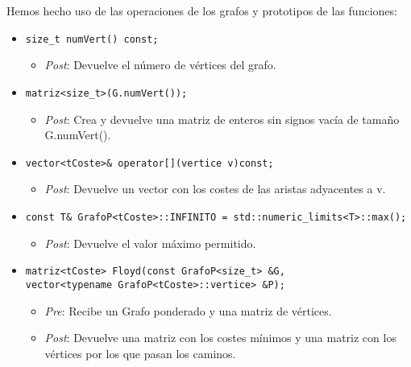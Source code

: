 Hemos hecho uso de las operaciones de los grafos y prototipos de las funciones:
\begin{itemize}
  \item \verb |size_t numVert() const;|
  \begin{itemize}
    \item \textit{Post}: Devuelve el número de vértices del grafo.
  \end{itemize}
  \item \verb |matriz<size_t>(G.numVert());|
  \begin{itemize}
    \item \textit{Post}: Crea y devuelve una matriz de enteros sin signos vacía de tamaño G.numVert().
  \end{itemize}
  \item \verb |vector<tCoste>& operator[](vertice v)const;|
  \begin{itemize}
    \item \textit{Post}: Devuelve un vector con los costes de las aristas adyacentes a v.
  \end{itemize}
  \item \verb |const T& GrafoP<tCoste>::INFINITO = std::numeric_limits<T>::max();|
  \begin{itemize}
    \item \textit{Post}: Devuelve el valor máximo permitido.
  \end{itemize}
  \item \verb |matriz<tCoste> Floyd(const GrafoP<size_t> &G,|\\ 
  \hspace*{0.5cm} \verb|vector<typename GrafoP<tCoste>::vertice> &P);|
  \begin{itemize}
    \item \textit{Pre}: Recibe un Grafo ponderado y una matriz de vértices.
    \item \textit{Post}: Devuelve una matriz con los costes mínimos y una matriz con los vértices por los que pasan los caminos.
  \end{itemize}
\end{itemize}